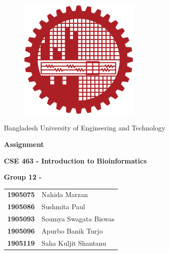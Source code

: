 \begin{figure}[H]
    \centering
    \includegraphics[width=6cm]{images/buet.png}
    \label{fig:logo}
\end{figure}

\begin{center}
    \huge{Bangladesh University of Engineering and Technology}
\end{center}

\vspace{1cm}
\begin{center}
    \parbox{\linewidth}{\centering
        \huge \textbf{Assignment}
    }
\end{center}
\vspace{1cm}
\begin{center}
    \parbox{\linewidth}{\centering 
        \Large \textbf{CSE 463 - Introduction to Bioinformatics }
    }
\end{center}

\vspace{1cm}
\begin{flushleft}
\vspace{50pt}
\Large \hspace{6pt}\textbf{Group 12 -}  \\
\vspace{10pt}
\begin{tabular}{ll}
\Large \textbf{1905075} & \Large Nahida Marzan 
\\
\Large \textbf{1905086} & \Large Sushmita Paul
\\
\Large \textbf{1905093} & \Large Soumya Swagata Biswas
\\
\Large \textbf{1905096} & \Large Apurbo Banik Turjo
\\
\Large \textbf{1905119} & \Large Saha Kuljit Shantanu


\end{tabular}
\end{flushleft}
